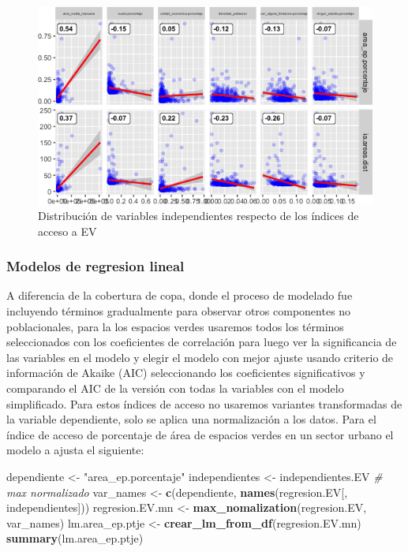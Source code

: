 \documentclass[12pt,]{book}
\newenvironment{Shaded}{\begin{snugshade}}{\end{snugshade}}
\newcommand{\KeywordTok}[1]{\textcolor[rgb]{0.13,0.29,0.53}{\textbf{#1}}}
\newcommand{\StringTok}[1]{\textcolor[rgb]{0.31,0.60,0.02}{#1}}
\newcommand{\CommentTok}[1]{\textcolor[rgb]{0.56,0.35,0.01}{\textit{#1}}}
\newcommand{\NormalTok}[1]{#1}
\begin{document}
\begin{figure}
\includegraphics[width=1\linewidth]{tesis-unigis_files/figure-latex/bivar-ev-1} \caption{Distribución de variables independientes respecto de los índices de acceso a EV}\label{fig:bivar-ev}
\end{figure}

\subsubsection{Modelos de regresion
lineal}\label{modelos-de-regresion-lineal-1}

A diferencia de la cobertura de copa, donde el proceso de modelado fue
incluyendo términos gradualmente para observar otros componentes no
poblacionales, para la los espacios verdes usaremos todos los términos
seleccionados con los coeficientes de correlación para luego ver la
significancia de las variables en el modelo y elegir el modelo con mejor
ajuste usando criterio de información de Akaike (AIC) seleccionando los
coeficientes significativos y comparando el AIC de la versión con todas
la variables con el modelo simplificado. Para estos índices de acceso no
usaremos variantes transformadas de la variable dependiente, solo se
aplica una normalización a los datos. Para el índice de acceso de
porcentaje de área de espacios verdes en un sector urbano el modelo a
ajusta el siguiente:

\begin{Shaded}
\begin{Highlighting}[]
\NormalTok{dependiente <-}\StringTok{ "area_ep.porcentaje"}
\NormalTok{independientes <-}\StringTok{ }\NormalTok{independientes.EV}
\CommentTok{# max normalizado}
\NormalTok{var_names <-}\StringTok{ }\KeywordTok{c}\NormalTok{(dependiente, }\KeywordTok{names}\NormalTok{(regresion.EV[, independientes]))}
\NormalTok{regresion.EV.mn <-}\StringTok{ }\KeywordTok{max_nomalization}\NormalTok{(regresion.EV, var_names)}
\NormalTok{lm.area_ep.ptje <-}\StringTok{ }\KeywordTok{crear_lm_from_df}\NormalTok{(regresion.EV.mn)}
\KeywordTok{summary}\NormalTok{(lm.area_ep.ptje)}
\end{Highlighting}
\end{Shaded}
\end{document}
